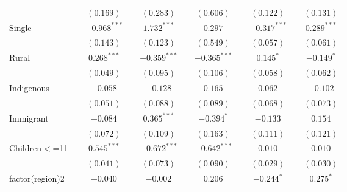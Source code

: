 \begin{tabular}{l c c c c c c c c c c}
                   &                & $(0.169)$      &                & $(0.283)$      &                & $(0.606)$      &                & $(0.122)$      &                & $(0.131)$      \\
Single             &                & $-0.968^{***}$ &                & $1.732^{***}$  &                & $0.297$        &                & $-0.317^{***}$ &                & $0.289^{***}$  \\
                   &                & $(0.143)$      &                & $(0.123)$      &                & $(0.549)$      &                & $(0.057)$      &                & $(0.061)$      \\
Rural              &                & $0.268^{***}$  &                & $-0.359^{***}$ &                & $-0.365^{***}$ &                & $0.145^{*}$    &                & $-0.149^{*}$   \\
                   &                & $(0.049)$      &                & $(0.095)$      &                & $(0.106)$      &                & $(0.058)$      &                & $(0.062)$      \\
Indigenous         &                & $-0.058$       &                & $-0.128$       &                & $0.165$        &                & $0.062$        &                & $-0.102$       \\
                   &                & $(0.051)$      &                & $(0.088)$      &                & $(0.089)$      &                & $(0.068)$      &                & $(0.073)$      \\
Immigrant          &                & $-0.084$       &                & $0.365^{***}$  &                & $-0.394^{*}$   &                & $-0.133$       &                & $0.154$        \\
                   &                & $(0.072)$      &                & $(0.109)$      &                & $(0.163)$      &                & $(0.111)$      &                & $(0.121)$      \\
Children$<$=11     &                & $0.545^{***}$  &                & $-0.672^{***}$ &                & $-0.642^{***}$ &                & $0.010$        &                & $0.010$        \\
                   &                & $(0.041)$      &                & $(0.073)$      &                & $(0.090)$      &                & $(0.029)$      &                & $(0.030)$      \\
factor(region)2    &                & $-0.040$       &                & $-0.002$       &                & $0.206$        &                & $-0.244^{*}$   &                & $0.275^{*}$    \\

\end{tabular}

